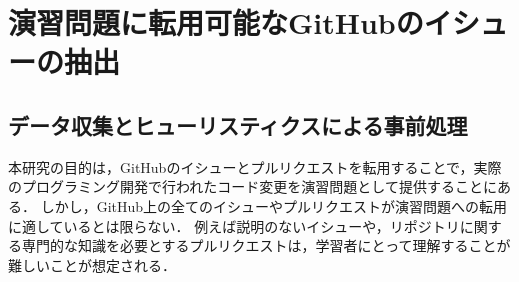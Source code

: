 \def\vector#1{\mbox{\boldmath $#1$}}

\chapter[演習問題に転用可能なGitHubのイシューの抽出]{演習問題に転用可能なGitHubのイシューの抽出}
\graphicspath{{Chapters_implementation/Figs/}}

\label{section:issue-classification}



\section{データ収集とヒューリスティクスによる事前処理}

本研究の目的は，GitHubのイシューとプルリクエストを転用することで，実際のプログラミング開発で行われたコード変更を演習問題として提供することにある．
しかし，GitHub上の全てのイシューやプルリクエストが演習問題への転用に適しているとは限らない．
例えば説明のないイシューや，リポジトリに関する専門的な知識を必要とするプルリクエストは，学習者にとって理解することが難しいことが想定される．


